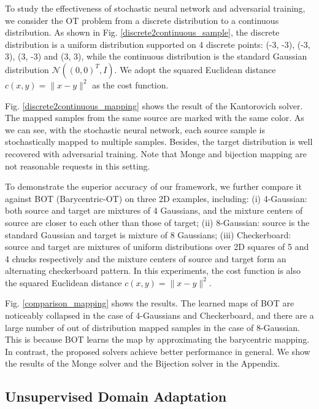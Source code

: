 \documentclass[runningheads]{llncs}
\begin{document}
To study the effectiveness of stochastic neural network and adversarial training, we consider the OT problem from a discrete distribution to a continuous distribution. As shown in Fig. \ref{discrete2continuous_sample}, the discrete distribution is a uniform distribution supported on 4 discrete points: (-3, -3), (-3, 3), (3, -3) and (3, 3), while the continuous distribution is the standard Gaussian distribution $\mathcal{N}((0, 0)^T, I)$. We adopt the squared Euclidean distance $c(x, y) = \| x - y \| ^ 2$ as the cost function. 

\noindent 
Fig. \ref{discrete2continuous_mapping} shows the result of the Kantorovich solver. The mapped samples from the same source are marked with the same color. As we can see, with the stochastic neural network, each source sample is stochastically mapped to multiple samples. Besides, the target distribution is well recovered with adversarial training. Note that Monge and bijection mapping are not reasonable requests in this setting. 

To demonstrate the superior accuracy of our framework, we further compare it against BOT (Barycentric-OT) \cite{large-scale} on three 2D examples, including: (i) 4-Gaussian: both source and target are mixtures of 4 Gaussians, and the mixture centers of source are closer to each other than those of target; (ii) 8-Gaussian: source is the standard Gaussian and target is mixture of 8 Gaussians; (iii) Checkerboard: source and target are mixtures of uniform distributions over 2D squares of 5 and 4 chucks respectively and the mixture centers of source and target form an alternating checkerboard pattern. In this experiments, the cost function is also the squared Euclidean distance $c(x, y) = \| x - y \| ^ 2$. 

Fig. \ref{comparison_mapping} shows the results. The learned maps of BOT are noticeably collapsed in the case of 4-Gaussians and Checkerboard, and there are a large number of out of distribution mapped samples in the case of 8-Gaussian. This is because BOT learns the map by approximating the barycentric mapping. In contrast, the proposed solvers achieve better performance in general. We show the results of the Monge solver and the Bijection solver in the Appendix. 


\subsection{Unsupervised Domain Adaptation}
\label{sec_exp_da}
\end{document}
